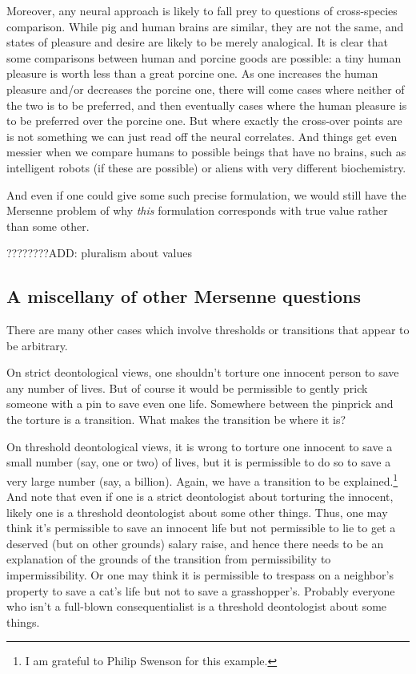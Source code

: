 Moreover, any neural approach is likely to fall prey to questions of cross-species comparison. While pig and human brains are
similar, they are not the same, and states of pleasure and desire are likely to be merely analogical. It is clear that some
comparisons between human and porcine goods are possible: a tiny human pleasure is worth less than a great porcine one. As one
increases the human pleasure and/or decreases the porcine one, there will come cases where neither of the two is to be
preferred, and then eventually cases where the human pleasure is to be preferred over the porcine one. But where exactly
the cross-over points are is not something we can just read off the neural correlates. And things get even messier when we
compare humans to possible beings that have no brains, such as intelligent robots (if these are possible) or aliens with very 
different biochemistry.

And even if one could give some such precise formulation, we would still have
the Mersenne problem of why \textit{this} formulation corresponds with true value rather than some other. 

????????ADD: pluralism about values

\subsection{A miscellany of other Mersenne questions}
There are many other cases which involve thresholds or transitions that appear to be arbitrary.

On strict deontological views, one shouldn't torture one innocent person to save any number of lives. But of course
it would be permissible to gently prick someone with a pin to save even one life. Somewhere between the pinprick
and the torture is a transition. What makes the transition be where it is?

On threshold deontological views, it is wrong to torture one innocent to save a small number (say, one or two) of lives,
but it is permissible to do so to save a very large number (say, a billion). Again, we have a transition to be 
explained.\footnote{I am grateful to Philip Swenson for this example.} And note that even if one is a strict deontologist
about torturing the innocent, likely one is a threshold deontologist about some other things. Thus, one may think it's
permissible to save an innocent life but not permissible to lie to get a deserved (but on other grounds) salary raise,
and hence there needs to be an explanation of the grounds of the transition from permissibility to impermissibility. Or
one may think it is permissible to trespass on a neighbor's property to save a cat's life but not to save a grasshopper's.
Probably everyone who isn't a full-blown consequentialist is a threshold deontologist about some things.

